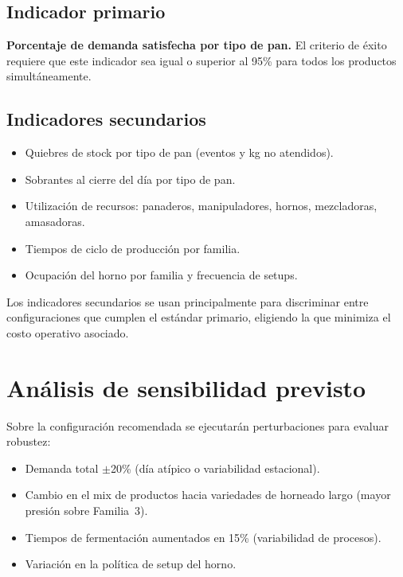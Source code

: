 \documentclass[12pt]{article}
\begin{document}
\subsection{Indicador primario}

\textbf{Porcentaje de demanda satisfecha por tipo de pan.} El criterio de éxito requiere que este indicador sea igual o superior al 95\% para todos los productos simultáneamente.

\subsection{Indicadores secundarios}

\begin{itemize}
  \item Quiebres de stock por tipo de pan (eventos y kg no atendidos).
  \item Sobrantes al cierre del día por tipo de pan.
  \item Utilización de recursos: panaderos, manipuladores, hornos, mezcladoras, amasadoras.
  \item Tiempos de ciclo de producción por familia.
  \item Ocupación del horno por familia y frecuencia de setups.
\end{itemize}

Los indicadores secundarios se usan principalmente para discriminar entre configuraciones que cumplen el estándar primario, eligiendo la que minimiza el costo operativo asociado.

\newpage
\section{Análisis de sensibilidad previsto}

Sobre la configuración recomendada se ejecutarán perturbaciones para evaluar robustez:

\begin{itemize}
  \item Demanda total $\pm$20\% (día atípico o variabilidad estacional).
  \item Cambio en el mix de productos hacia variedades de horneado largo (mayor presión sobre Familia~3).
  \item Tiempos de fermentación aumentados en 15\% (variabilidad de procesos).
  \item Variación en la política de setup del horno.
\end{itemize}
\end{document}
